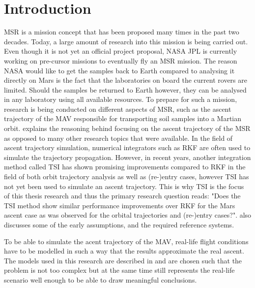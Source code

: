 \chapter{Introduction}  
\label{ch:intro}
\acf{MSR} is a mission concept that has been proposed many times in the past two decades. Today, a large amount of research into this mission is being carried out. Even though it is not yet an official project proposal, \acf{NASA} \acf{JPL} is currently working on pre-cursor missions to eventually fly an \ac{MSR} mission. The reason \ac{NASA} would like to get the samples back to Earth compared to analysing it directly on Mars is the fact that the laboratories on board the current rovers are limited. Should the samples be returned to Earth however, they can be analysed in any laboratory using all available resources.  To prepare for such a mission, research is being conducted on different aspects of \ac{MSR}, such as the ascent trajectory of the \acf{MAV} responsible for transporting soil samples into a Martian orbit.  explains the reasoning behind focusing on the ascent trajectory of the \ac{MSR} as opposed to many other research topics that were available. In the field of ascent trajectory simulation, numerical integrators such as \acf{RKF} are often used to simulate the trajectory propagation. However, in recent years, another integration method called \acf{TSI} has shown promising improvements compared to \ac{RKF} in the field of both orbit trajectory analysis as well as (re-)entry cases, however \ac{TSI} has not yet been used to simulate an ascent trajectory. This is why \ac{TSI} is the focus of this thesis research and thus the primary research question reads: "Does the \ac{TSI} method show similar performance improvements over \ac{RKF} for the Mars ascent case as was observed for the orbital trajectories and (re-)entry cases?".  also discusses some of the early assumptions, and the required reference systems.

To be able to simulate the acent trajectory of the \ac{MAV}, real-life flight conditions have to be modelled in such a way that the results approximate the real ascent. The models used in this research are described in  and are chosen such that the problem is not too complex but at the same time still represents the real-life scenario well enough to be able to draw meaningful conclusions.

